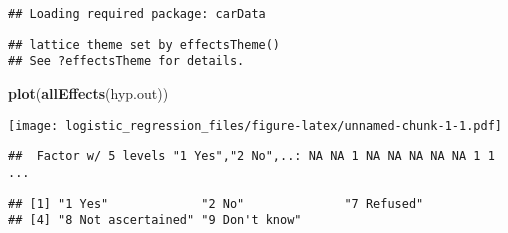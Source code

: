 \documentclass[]{article}
\newenvironment{Shaded}{\begin{snugshade}}{\end{snugshade}}
\newcommand{\KeywordTok}[1]{\textcolor[rgb]{0.13,0.29,0.53}{\textbf{#1}}}
\newcommand{\CommentTok}[1]{\textcolor[rgb]{0.56,0.35,0.01}{\textit{#1}}}
\newcommand{\OperatorTok}[1]{\textcolor[rgb]{0.81,0.36,0.00}{\textbf{#1}}}
\newcommand{\NormalTok}[1]{#1}
\begin{document}
\begin{verbatim}
## Loading required package: carData
\end{verbatim}

\begin{verbatim}
## lattice theme set by effectsTheme()
## See ?effectsTheme for details.
\end{verbatim}

\begin{Shaded}
\begin{Highlighting}[]
\KeywordTok{plot}\NormalTok{(}\KeywordTok{allEffects}\NormalTok{(hyp.out))}
\end{Highlighting}
\end{Shaded}

\texttt{[image: logistic\_regression\_files/figure-latex/unnamed-chunk-1-1.pdf]}

\begin{Shaded}
\end{Shaded}

\begin{verbatim}
##  Factor w/ 5 levels "1 Yes","2 No",..: NA NA 1 NA NA NA NA NA 1 1 ...
\end{verbatim}

\begin{Shaded}
\end{Shaded}

\begin{verbatim}
## [1] "1 Yes"             "2 No"              "7 Refused"        
## [4] "8 Not ascertained" "9 Don't know"
\end{verbatim}
\end{document}
